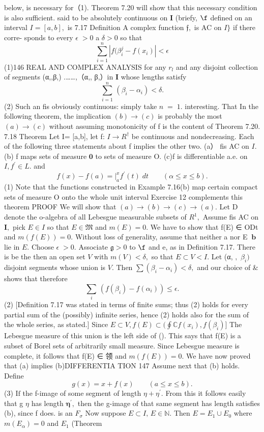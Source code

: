 below, is necessary for（1). Theorem 7.20 will show that this necessary condition is also sufficient. said to be absolutely continuous on ${\mathbf I}$ (briefy, $\boldsymbol{\f}$ defined on an interval $I=[a,b],$ is 7.17 Definition A complex function ${\mathfrak{f}},$ is AC on ${\boldsymbol{\mathit{I}}}\}$ if there corre- sponds to every $\scriptstyle\epsilon\;>0$ a $\scriptstyle\delta>0$ so that $$ \sum_{i=1}^{n}|f(\beta_{i}^{j}-f(x_{i})|<\epsilon $$ (1)146 REAL AND COMPLEX ANALYSIS for any $r_{\mathit{l}}$ and any disjoint collection of segments (α,,β,) .……,（α,, β,）in ${\mathbf I}$ whose lengths satisfy $$ \sum_{i=1}^{n}\,(\beta_{i}-\alpha_{i})<\delta. $$ (2) Such an fis obviously continuous: simply take $\scriptstyle n\;=\;1.$ interesting. That In the following theorem, the implication $(b)\to(c)$ is probably the most $(a)\to(c)$ without assuming monotonicity of f is the content of Theorem 7.20. 7.18 Theorem Let I= [a,b], let f: $\scriptstyle I\to R^{\dagger}$ be continuous and nondecreasing. Each of the following three statements about f implies the other two. (a） fis AC on ${\mathit{I}}.$ (b) f maps sets of measure $\mathbf{0}$ to sets of measure O. (c)f is differentiable a.e. on $I,f^{\prime}\in L.$ and $$ f(x)-f(a)=\left.\right|_{a}^{x}f^{\prime}(t)\;d t\qquad(\alpha\leq x\leq b). $$ (1) Note that the functions constructed in Example 7.16(b) map certain compact sets of measure O onto the whole unit interval Exercise 12 complements this theorem PROOF We will show that $(a)\to(b)\to(c)\to(a).$ Let D denote the o-algebra of all Lebesgue measurable subsets of $R^{1},$ Assume fis AC on ${\boldsymbol{I}},$ pick $\scriptstyle{E\in I}$ so that $E\in{\mathfrak{M}}$ and $m(E)=0.$ We have to show that f(E) ∈ ODt and $m(f(E))=0.$ Without loss of generality, assume that neither a nor E $\boldsymbol{\ b}$ lie in $\textstyle E.$ Choose $\scriptstyle\epsilon\;>0.$ Associate $\mathfrak{g}>0$ to $\boldsymbol{\f}$ and e, as in Definition 7.17. There is be the then an open set ${\mathbf{}}V$ with $m(V)<\delta,$ so that $E\subset V<I.$ Let (α, $,\,\,\beta_{i})$ disjoint segments whose union is $V.$ Then $\sum\left(\beta_{i}-\alpha_{i}\right)<\delta,$ and our choice of & shows that therefore $$ \sum_{i}\,(f(\beta_{i})-f(\alpha_{i}))\leq\epsilon. $$ (2) [Definition 7.17 was stated in terms of finite sums; thus (2) holds for every partial sum of the (possibly) infinite series, hence (2) holds also for the sum of the whole series, as stated.] Since $E\subset V,f(E)\subset(\oint\mathbb{C}f(x_{i}),f(\beta_{i})]$ The Lebesgue measure of this union is the left side of (). This says that f(E) is a subset of Borel sets of arbitrarily small measure. Since Lebesgue measure is complete, it follows that f(E) ∈ 领 and $m(f(E))=0.$ We have now proved that (a) implies (b)DIFFERENTIA TION 147 Assume next that (b) holds. Define $$ g(x)=x+f(x)\qquad(a\leq x\leq b). $$ (3) $\mathrm{If}$ the f-image of some segment of length $\eta+\eta^{\prime}.$ From this it follows easily that g $\textstyle\eta$ has length ${\boldsymbol{\eta}}^{\prime},$ then the g-image of that same segment has length satisfies (b), since f does. is an $F_{\sigma}$ Now suppose $E\subset I,\,E\in\mathbb{N}.$ Then $E=E_{1}\cup E_{0}$ where $m(E_{\alpha})=0$ and $E_{1}$ (Theorem 